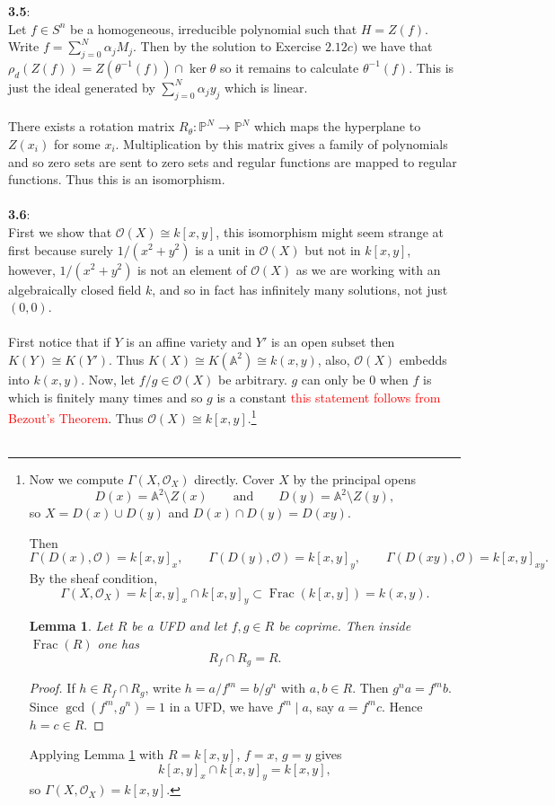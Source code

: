 \documentclass[12pt]{article}
\numberwithin{thm}{subsection}
\numberwithin{defn}{subsection}
\newtheorem{lemma}{Lemma}
\numberwithin{lemma}{subsection}
\numberwithin{example}{subsection}
\numberwithin{notation}{subsection}
\numberwithin{cor}{subsection}
\numberwithin{remark}{subsection}
\numberwithin{condition}{subsection}
\numberwithin{question}{subsection}
\numberwithin{construction}{subsection}
\numberwithin{construction}{subsection}
\numberwithin{construction}{subsection}
\newcommand{\bb}[1]{\mathbb{#1}}
\newcommand{\call}[1]{\mathcal{#1}}
\newcommand{\lto}{\longrightarrow}
\begin{document}
%
\textbf{3.5}:\\
Let $f \in S^n$ be a homogeneous, irreducible polynomial such that $H = Z(f)$. Write $f = \sum_{j = 0}^{N}\alpha_j M_j$. Then by the solution to Exercise $2.12c)$ we have that $\rho_d(Z(f)) = Z(\theta^{-1}(f)) \cap \ker \theta$ so it remains to calculate $\theta^{-1}(f)$. This is just the ideal generated by $\sum_{j = 0}^N \alpha_j y_j$ which is linear.\\\\
%
There exists a rotation matrix $R_\theta: \bb{P}^N \lto \bb{P}^N$ which maps the hyperplane to $Z(x_i)$ for some $x_i$. Multiplication by this matrix gives a family of polynomials and so zero sets are sent to zero sets and regular functions are mapped to regular functions. Thus this is an isomorphism.\\\\
%
\textbf{3.6}:\\
First we show that $\call{O}(X) \cong k[x,y]$, this isomorphism might seem strange at first because surely $1/(x^2+y^2)$ is a unit in $\call{O}(X)$ but not in $k[x,y]$, however, $1/(x^2 + y^2)$ is not an element of $\call{O}(X)$ as we are working with an algebraically closed field $k$, and so in fact has infinitely many solutions, not just $(0,0)$.\\\\
%
First notice that if $Y$ is an affine variety and $Y'$ is an open subset then $K(Y) \cong K(Y')$. Thus $K(X) \cong K(\bb{A}^2) \cong k(x,y)$, also, $\call{O}(X)$ embedds into $k(x,y)$. Now, let $f/g \in \call{O}(X)$ be arbitrary. $g$ can only be $0$ when $f$ is which is finitely many times and so $g$ is a constant \textcolor{red}{this statement follows from Bezout's Theorem}. Thus $\call{O}(X) \cong k[x,y]$.\footnote{Now we compute $\Gamma(X,\mathcal O_X)$ directly. Cover $X$ by the principal opens
\[
D(x)=\bb{A}^2\setminus Z(x)\qquad\text{and}\qquad D(y)=\bb{A}^2\setminus Z(y),
\]
so $X=D(x)\cup D(y)$ and $D(x)\cap D(y)=D(xy)$.

Then
\[
\Gamma(D(x),\mathcal O)=k[x,y]_x,\qquad
\Gamma(D(y),\mathcal O)=k[x,y]_y,\qquad
\Gamma(D(xy),\mathcal O)=k[x,y]_{xy}.
\]
By the sheaf condition,
\[
\Gamma(X,\mathcal O_X)=k[x,y]_x\cap k[x,y]_y\subset \operatorname{Frac}(k[x,y])=k(x,y).
\]

\begin{lemma}
\label{lem:intersection_localisations}
Let $R$ be a UFD and let $f,g\in R$ be coprime. Then inside $\operatorname{Frac}(R)$ one has
\[
R_f\cap R_g = R.
\]
\end{lemma}
\begin{proof}
If $h\in R_f\cap R_g$, write $h=a/f^m=b/g^n$ with $a,b\in R$. Then $g^n a=f^m b$.
Since $\gcd(f^m,g^n)=1$ in a UFD, we have $f^m\mid a$, say $a=f^m c$. Hence $h=c\in R$.
\end{proof}

Applying Lemma \ref{lem:intersection_localisations} with $R=k[x,y]$, $f=x$, $g=y$ gives
\[
k[x,y]_x\cap k[x,y]_y = k[x,y],
\]
so $\Gamma(X,\mathcal O_X)=k[x,y]$.}\\\\
\end{document}

